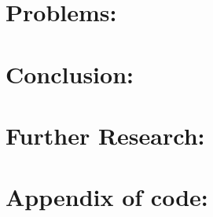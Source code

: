 \documentclass[12pt]{article}
\begin{document}
\section{Problems:}

\section{Conclusion:}

\section{Further Research:}


\appendix
\section{Appendix of code:}




\end{document}
